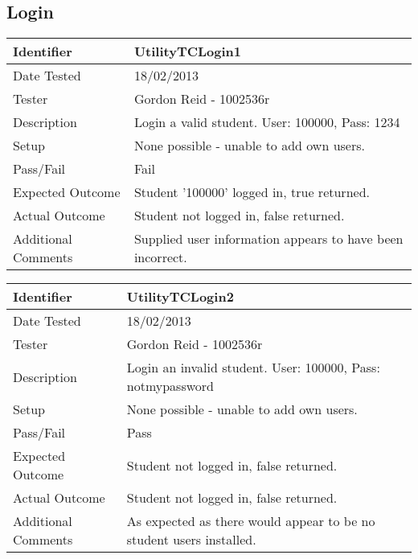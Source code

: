 \documentclass[11pt]{l3deliverable}
\begin{document}
\subsection{Login}

\begin{tabularx}{\textwidth}{|T|L|}
\hline
Identifier & UtilityTCLogin1\\
\hline
Date Tested & 18/02/2013\\
\hline
Tester & Gordon Reid - 1002536r\\
\hline
Description & Login a valid student. User: 100000, Pass: 1234\\
\hline
Setup & None possible - unable to add own users.\\
\hline
Pass/Fail & Fail\\
\hline
Expected Outcome & Student '100000' logged in, true returned.\\
\hline
Actual Outcome & Student not logged in, false returned.\\
\hline
Additional Comments & Supplied user information appears to have been 
incorrect.\\
\hline
\end{tabularx}

\vspace{2em}

\begin{tabularx}{\textwidth}{|T|L|}
\hline
Identifier & UtilityTCLogin2\\
\hline
Date Tested & 18/02/2013\\
\hline
Tester & Gordon Reid - 1002536r\\
\hline
Description & Login an invalid student. User: 100000, Pass: notmypassword\\
\hline
Setup & None possible - unable to add own users.\\
\hline
Pass/Fail & Pass\\
\hline
Expected Outcome & Student not logged in, false returned.\\
\hline
Actual Outcome & Student not logged in, false returned.\\
\hline
Additional Comments & As expected as there would appear to be no student 
users installed.\\
\hline
\end{tabularx}

\vspace{2em}
\end{document}
